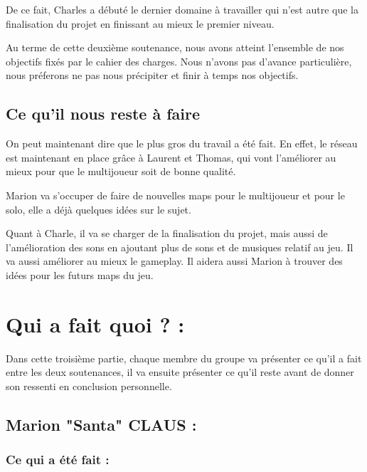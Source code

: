 \documentclass{article}
\begin{document}
De ce fait, Charles a débuté le dernier domaine à travailler qui n’est autre que la finalisation du projet en finissant au mieux le premier niveau.

Au terme de cette deuxième soutenance, nous avons atteint l’ensemble de nos objectifs fixés par le cahier des charges. Nous n’avons pas d’avance particulière, nous préferons ne pas nous précipiter et finir à temps nos objectifs.



\newpage

	\subsection{Ce qu'il nous reste à faire}

\quad

\quad


On peut maintenant dire que le plus gros du travail a été fait. En effet, le réseau est maintenant en place grâce à Laurent et Thomas, qui vont l’améliorer au mieux pour que le multijoueur soit de bonne qualité.

Marion va s’occuper de faire de nouvelles maps pour le multijoueur et pour le solo, elle a déjà quelques idées sur le sujet.

Quant à Charle, il va se charger de la finalisation du projet, mais aussi de l’amélioration des sons en ajoutant plus de sons et de musiques relatif au jeu. Il va aussi améliorer au mieux le gameplay. Il aidera aussi Marion à trouver des idées pour les futurs maps du jeu.

\quad

\quad

\newpage


\section{Qui a fait quoi ? :}

\quad

Dans cette troisième partie, chaque membre du groupe va présenter ce qu'il a fait entre les deux soutenances, il va ensuite présenter ce qu'il reste avant de donner son ressenti en conclusion personnelle.


	\subsection{Marion "Santa" CLAUS :}

\quad


		\subsubsection{Ce qui a été fait :}
\end{document}
